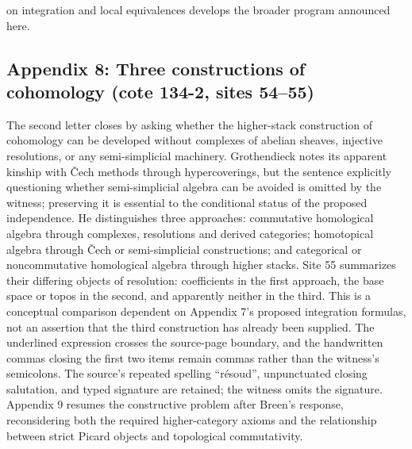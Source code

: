 on integration and local equivalences develops the broader program announced here.

\subsection*{Appendix 8: Three constructions of cohomology (cote 134-2, sites 54--55)}
The second letter closes by asking whether the higher-stack construction of cohomology can be developed without complexes of abelian sheaves, injective resolutions, or any semi-simplicial machinery. Grothendieck notes its apparent kinship with \v Cech methods through hypercoverings, but the sentence explicitly questioning whether semi-simplicial algebra can be avoided is omitted by the witness; preserving it is essential to the conditional status of the proposed independence. He distinguishes three approaches: commutative homological algebra through complexes, resolutions and derived categories; homotopical algebra through \v Cech or semi-simplicial constructions; and categorical or noncommutative homological algebra through higher stacks. Site 55 summarizes their differing objects of resolution: coefficients in the first approach, the base space or topos in the second, and apparently neither in the third. This is a conceptual comparison dependent on Appendix 7's proposed integration formulas, not an assertion that the third construction has already been supplied. The underlined expression crosses the source-page boundary, and the handwritten commas closing the first two items remain commas rather than the witness's semicolons. The source's repeated spelling ``résoud'', unpunctuated closing salutation, and typed signature are retained; the witness omits the signature. Appendix 9 resumes the constructive problem after Breen's response, reconsidering both the required higher-category axioms and the relationship between strict Picard objects and topological commutativity.

